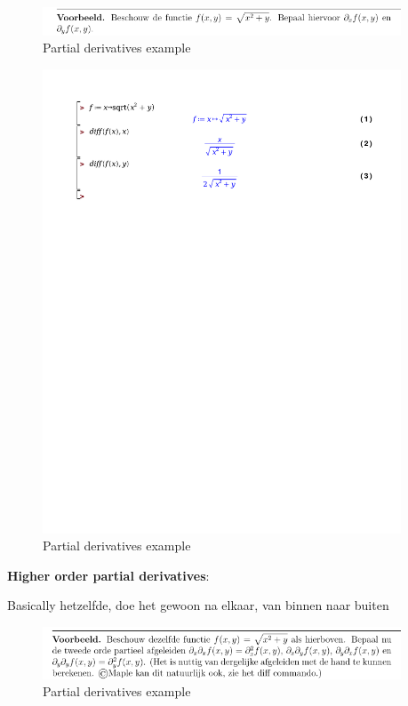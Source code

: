 \documentclass[a4paper]{report}
\begin{document}
\begin{figure}[H]
	\begin{center}
		\includegraphics[width=0.95\textwidth]{./images/partial.png}
	\end{center}
	\caption{Partial derivatives example}
	\label{}
\end{figure}
\begin{figure}[H]
	\begin{center}
		\includegraphics[width=0.95\textwidth]{./partial.pdf}
	\end{center}
	\caption{Partial derivatives example}
	\label{}
\end{figure}

\textbf{Higher order partial derivatives}:

Basically hetzelfde, doe het gewoon na elkaar, van binnen naar buiten

\begin{figure}[H]
	\begin{center}
		\includegraphics[width=0.95\textwidth]{./images/partial_2.png}
	\end{center}
	\caption{Partial derivatives example}
	\label{}
\end{figure}
\end{document}
